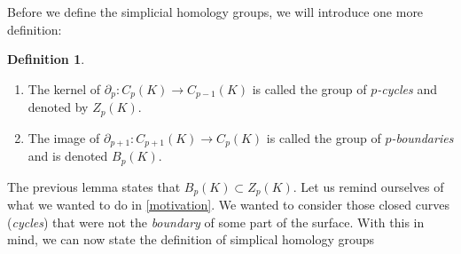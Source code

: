 \documentclass[toc=bib, headinclude]{scrartcl}
\theoremstyle{plain}
\theoremstyle{definition}
\newtheorem	{definition}[theorem]{Definition}
\theoremstyle{remark}
\begin{document}
Before we define the simplicial homology groups, we will introduce one more definition:

\begin{definition}\mbox{}
	\begin{enumerate}
		\item The kernel of $\partial_p: C_p(K)\to C_{p-1}(K)$ is called the group of \textit{$p$-cycles} and denoted by $Z_p(K)$.
		\item The image of $\partial_{p+1}: C_{p+1}(K)\to C_{p}(K)$ is called the group of \textit{$p$-boundaries} and is denoted $B_p(K)$.
	\end{enumerate}
	
\end{definition}
The previous lemma states that $B_p(K)\subset Z_p(K)$.
Let us remind ourselves of what we wanted to do in \autoref{motivation}. We wanted to consider those closed curves (\emph{cycles}) that were not the \emph{boundary} of some part of the surface. With this in mind, we can now state the definition of simplical homology groups
\end{document}
